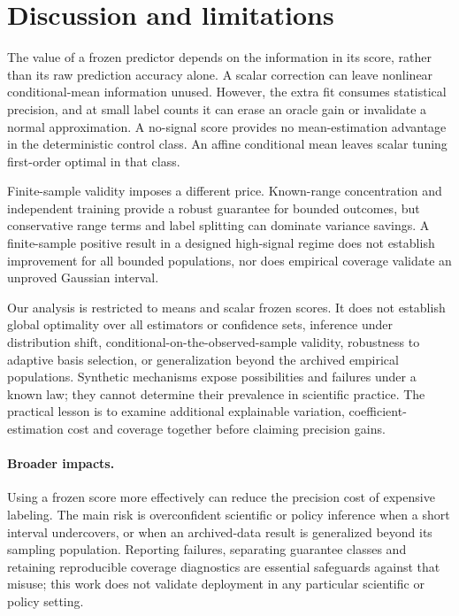 

\section{Discussion and limitations}\label{sec:limitations}
The value of a frozen predictor depends on the information in its score, rather than its raw prediction accuracy alone. A scalar correction can leave nonlinear conditional-mean information unused. However, the extra fit consumes statistical precision, and at small label counts it can erase an oracle gain or invalidate a normal approximation. A no-signal score provides no mean-estimation advantage in the deterministic control class. An affine conditional mean leaves scalar tuning first-order optimal in that class.

Finite-sample validity imposes a different price. Known-range concentration and independent training provide a robust guarantee for bounded outcomes, but conservative range terms and label splitting can dominate variance savings. A finite-sample positive result in a designed high-signal regime does not establish improvement for all bounded populations, nor does empirical coverage validate an unproved Gaussian interval.

Our analysis is restricted to means and scalar frozen scores. It does not establish global optimality over all estimators or confidence sets, inference under distribution shift, conditional-on-the-observed-sample validity, robustness to adaptive basis selection, or generalization beyond the archived empirical populations. Synthetic mechanisms expose possibilities and failures under a known law; they cannot determine their prevalence in scientific practice. The practical lesson is to examine additional explainable variation, coefficient-estimation cost and coverage together before claiming precision gains.


\paragraph{Broader impacts.} Using a frozen score more effectively can reduce the precision cost of expensive labeling. The main risk is overconfident scientific or policy inference when a short interval undercovers, or when an archived-data result is generalized beyond its sampling population. Reporting failures, separating guarantee classes and retaining reproducible coverage diagnostics are essential safeguards against that misuse; this work does not validate deployment in any particular scientific or policy setting.
